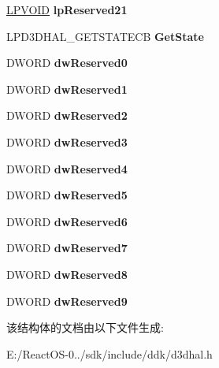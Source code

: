 \begin{DoxyCompactItemize}
\hyperlink{interfacevoid}{L\+P\+V\+O\+ID} {\bfseries lp\+Reserved21}
\item 
\mbox{\label{struct___d3_d_h_a_l___c_a_l_l_b_a_c_k_s_a0e7afc5c06c5641bcfb0d9060be0ee77}} 
L\+P\+D3\+D\+H\+A\+L\+\_\+\+G\+E\+T\+S\+T\+A\+T\+E\+CB {\bfseries Get\+State}
\item 
\mbox{\label{struct___d3_d_h_a_l___c_a_l_l_b_a_c_k_s_a7dc8be7ad1a4a3eb4e62a94495e512df}} 
D\+W\+O\+RD {\bfseries dw\+Reserved0}
\item 
\mbox{\label{struct___d3_d_h_a_l___c_a_l_l_b_a_c_k_s_a23155db5fed52877c8da5eb6a5fa8203}} 
D\+W\+O\+RD {\bfseries dw\+Reserved1}
\item 
\mbox{\label{struct___d3_d_h_a_l___c_a_l_l_b_a_c_k_s_a45ffc2a4c3f8c8760a23eb043095ec34}} 
D\+W\+O\+RD {\bfseries dw\+Reserved2}
\item 
\mbox{\label{struct___d3_d_h_a_l___c_a_l_l_b_a_c_k_s_a7f1b3263c1df789f434693a05ac937cf}} 
D\+W\+O\+RD {\bfseries dw\+Reserved3}
\item 
\mbox{\label{struct___d3_d_h_a_l___c_a_l_l_b_a_c_k_s_a73bb3d0d1d460e216b9cfddfbfe9a4cb}} 
D\+W\+O\+RD {\bfseries dw\+Reserved4}
\item 
\mbox{\label{struct___d3_d_h_a_l___c_a_l_l_b_a_c_k_s_a695257de7e70097f9cd0ec831a1036ff}} 
D\+W\+O\+RD {\bfseries dw\+Reserved5}
\item 
\mbox{\label{struct___d3_d_h_a_l___c_a_l_l_b_a_c_k_s_acb99037dbfa8bca281490d79333d9a46}} 
D\+W\+O\+RD {\bfseries dw\+Reserved6}
\item 
\mbox{\label{struct___d3_d_h_a_l___c_a_l_l_b_a_c_k_s_ace7b33662403273717bda40faaae385e}} 
D\+W\+O\+RD {\bfseries dw\+Reserved7}
\item 
\mbox{\label{struct___d3_d_h_a_l___c_a_l_l_b_a_c_k_s_a2a8514d83814a5f0178d425b3c7e0cc6}} 
D\+W\+O\+RD {\bfseries dw\+Reserved8}
\item 
\mbox{\label{struct___d3_d_h_a_l___c_a_l_l_b_a_c_k_s_abad10c98aa215daeb44ff0edb3c2b02a}} 
D\+W\+O\+RD {\bfseries dw\+Reserved9}
\end{DoxyCompactItemize}


该结构体的文档由以下文件生成\+:\begin{DoxyCompactItemize}
\item 
E\+:/\+React\+O\+S-\/0../sdk/include/ddk/d3dhal.\+h\end{DoxyCompactItemize}
